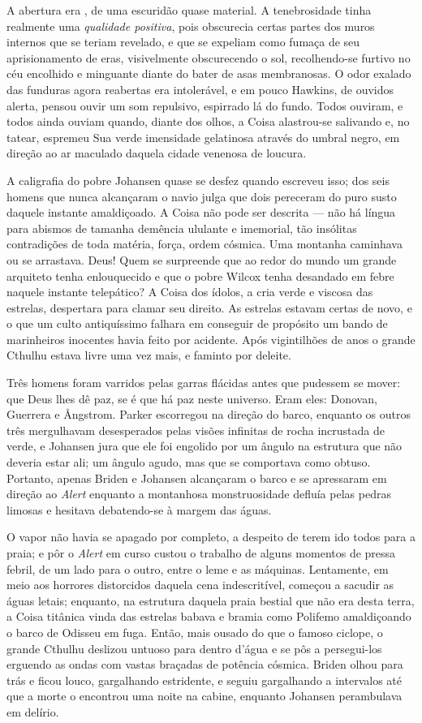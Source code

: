 A abertura era , de uma escuridão quase material. A tenebrosidade
tinha realmente uma \emph{qualidade positiva}, pois obscurecia certas
partes dos muros internos que se teriam revelado, e que se expeliam como
fumaça de seu aprisionamento de eras, visivelmente obscurecendo o sol,
recolhendo-se furtivo no céu encolhido e minguante diante do bater de
asas membranosas. O odor exalado das funduras agora reabertas era
intolerável, e em pouco Hawkins, de ouvidos alerta, pensou ouvir um som
repulsivo, espirrado lá do fundo. Todos ouviram, e todos ainda ouviam
quando, diante dos olhos, a Coisa alastrou-se salivando e, no tatear,
espremeu Sua verde imensidade gelatinosa através do umbral negro, em
direção ao ar maculado daquela cidade venenosa de loucura.

A caligrafia do pobre Johansen quase se desfez quando escreveu isso; dos
seis homens que nunca alcançaram o navio julga que dois pereceram do
puro susto daquele instante amaldiçoado. A Coisa não pode ser descrita
--- não há língua para abismos de tamanha demência ululante e imemorial,
tão insólitas contradições de toda matéria, força, ordem cósmica. Uma
montanha caminhava ou se arrastava. Deus! Quem se surpreende que ao
redor do mundo um grande arquiteto tenha enlouquecido e que o pobre
Wilcox tenha desandado em febre naquele instante telepático? A Coisa dos
ídolos, a cria verde e viscosa das estrelas, despertara para clamar seu
direito. As estrelas estavam certas de novo, e o que um culto
antiquíssimo falhara em conseguir de propósito um bando de marinheiros
inocentes havia feito por acidente. Após vigintilhões de anos o grande
Cthulhu estava livre uma vez mais, e faminto por deleite.

Três homens foram varridos pelas garras flácidas antes que pudessem se
mover: que Deus lhes dê paz, se é que há paz neste universo. Eram eles:
Donovan, Guerrera e Ångstrom. Parker escorregou na direção do barco,
enquanto os outros três mergulhavam desesperados pelas visões infinitas
de rocha incrustada de verde, e Johansen jura que ele foi engolido por
um ângulo na estrutura que não deveria estar ali; um ângulo agudo, mas
que se comportava como obtuso. Portanto, apenas Briden e Johansen
alcançaram o barco e se apressaram em direção ao \emph{Alert} enquanto
a montanhosa monstruosidade defluía pelas pedras limosas e hesitava
debatendo-se à margem das águas.

O vapor não havia se apagado por completo, a despeito de terem ido todos
para a praia; e pôr o \emph{Alert} em curso custou o trabalho de alguns
momentos de pressa febril, de um lado para o outro, entre o leme e as
máquinas. Lentamente, em meio aos horrores distorcidos daquela cena
indescritível, começou a sacudir as águas letais; enquanto, na estrutura
daquela praia bestial que não era desta terra, a Coisa titânica vinda
das estrelas babava e bramia como Polifemo amaldiçoando o barco de
Odisseu em fuga. Então, mais ousado do que o famoso ciclope, o grande
Cthulhu deslizou untuoso para dentro d'água e se pôs a persegui-los
erguendo as ondas com vastas braçadas de potência cósmica. Briden olhou
para trás e ficou louco, gargalhando estridente, e seguiu gargalhando a
intervalos até que a morte o encontrou uma noite na cabine, enquanto
Johansen perambulava em delírio.

